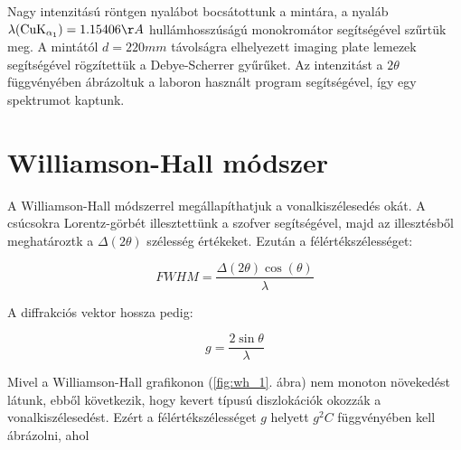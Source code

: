 \documentclass[12pt]{article}
\theoremstyle{plain}
\begin{document}
\vspace{.2cm}

\par Nagy intenzitású röntgen nyalábot bocsátottunk a mintára, a nyaláb $\lambda(\textrm{CuK}_{\alpha_1}) = 1.15406\AA$ hullámhosszúságú
monokromátor segítségével szűrtük meg. A mintától $d=220 mm$ távolságra elhelyezett imaging plate lemezek segítségével rögzítettük 
a Debye-Scherrer gyűrűket. Az intenzitást a $2\theta$ függvényében ábrázoltuk a laboron használt program segítségével,
így egy spektrumot kaptunk.

\section{Williamson-Hall módszer}

\vspace{.2cm}

\par A Williamson-Hall módszerrel megállapíthatjuk a vonalkiszélesedés okát. A csúcsokra Lorentz-görbét illesztettünk
a szofver segítségével, majd az illesztésből meghatároztk a $\Delta (2\theta)$ szélesség értékeket. Ezután a félértékszélességet:

\vspace{.2cm}

\begin{equation*}
	FWHM = \frac{\Delta (2\theta) \cos(\theta)}{\lambda}
	\label{eq:fwhm}
\end{equation*}

\vspace{.2cm}

\par A diffrakciós vektor hossza pedig:

\vspace{.2cm}

\begin{equation*}
	g = \frac{2\sin\theta}{\lambda}
	\label{eq:diffvec}
\end{equation*}

\vspace{.2cm}

\par Mivel a Williamson-Hall grafikonon (\ref{fig:wh_1}. ábra) nem monoton növekedést látunk, ebből következik, hogy kevert típusú
diszlokációk okozzák a vonalkiszélesedést. Ezért a félértékszélességet $g$ helyett $g^2C$ függvényében kell ábrázolni, ahol

\vspace{.2cm}
\end{document}

